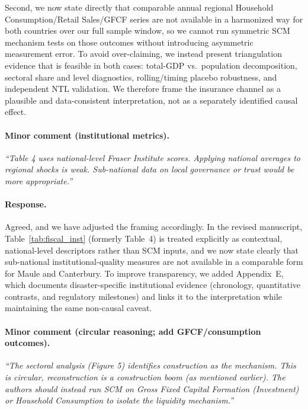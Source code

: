 Second, we now state directly that comparable annual regional Household Consumption/Retail Sales/GFCF series are not available in a harmonized way for both countries over our full sample window, so we cannot run symmetric SCM mechanism tests on those outcomes without introducing asymmetric measurement error. To avoid over-claiming, we instead present triangulation evidence that is feasible in both cases: total-GDP vs.\ population decomposition, sectoral share and level diagnostics, rolling/timing placebo robustness, and independent NTL validation. We therefore frame the insurance channel as a plausible and data-consistent interpretation, not as a separately identified causal effect.

\paragraph{Minor comment (institutional metrics).}
\textit{``Table 4 uses national-level Fraser Institute scores. Applying national averages to regional shocks is weak. Sub-national data on local governance or trust would be more appropriate.''}

\paragraph{Response.}
Agreed, and we have adjusted the framing accordingly. In the revised manuscript, Table~\ref{tab:fiscal_inst} (formerly Table~4) is treated explicitly as contextual, national-level descriptors rather than SCM inputs, and we now state clearly that sub-national institutional-quality measures are not available in a comparable form for Maule and Canterbury. To improve transparency, we added Appendix~E, which documents disaster-specific institutional evidence (chronology, quantitative contrasts, and regulatory milestones) and links it to the interpretation while maintaining the same non-causal caveat.

\paragraph{Minor comment (circular reasoning; add GFCF/consumption outcomes).}
\textit{``The sectoral analysis (Figure 5) identifies construction as the mechanism. This is circular, reconstruction is a construction boom (as mentioned earlier). The authors should instead run SCM on Gross Fixed Capital Formation (Investment) or Household Consumption to isolate the liquidity mechanism.''}

